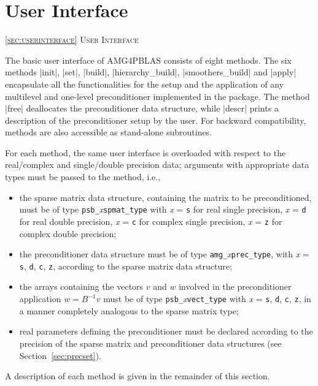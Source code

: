 \section{User Interface\label{sec:userinterface}}
         {\textsc{\ref{sec:userinterface} User Interface}}

The basic user interface of AMG4PBLAS consists of eight methods. The six
methods \fortinline|init|, \fortinline|set|, \fortinline|build|,
\fortinline|hierarchy_build|, \fortinline|smoothers_build| and \fortinline|apply|
encapsulate all the functionalities for the setup and the application
of any multilevel and one-level preconditioner implemented in the
package.
The method \fortinline|free| deallocates the preconditioner data structure, while
\fortinline|descr| prints a description of the preconditioner setup by the user.
For backward compatibility,  methods are also accessible as
stand-alone subroutines.

For each method, the same user interface is overloaded with
respect to the real/\-com\-plex  and single/double precision data;
arguments with appropriate data types must be passed to the method, i.e.,
\begin{itemize}
\item the sparse matrix data structure, containing the matrix to be
  preconditioned, must be of type \verb|psb_|\emph{x}\verb|spmat_type| 
  with \emph{x} = \verb|s| for real single precision, \emph{x} =
  \verb|d| for real double precision, \emph{x} = \verb|c| for complex
  single precision, \emph{x} = \verb|z| for complex double precision;
\item the preconditioner data structure must be of type
  \verb|amg_|\emph{x}\verb|prec_type|, with \emph{x} =
  \verb|s|, \verb|d|, \verb|c|, \verb|z|, according to the sparse
  matrix data structure;
\item the arrays containing the vectors $v$ and $w$ involved in
  the preconditioner application $w=B^{-1}v$ must be of type
  \verb|psb_|\emph{x}\verb|vect_type| with \emph{x} =
  \verb|s|, \verb|d|, \verb|c|, \verb|z|, in a manner completely
  analogous to the sparse matrix type;
\item real parameters defining the preconditioner must be declared
  according to the precision of the sparse matrix and preconditioner
  data structures (see Section~\ref{sec:precset}).
\end{itemize}
A description of each method is given in the remainder of this section.

